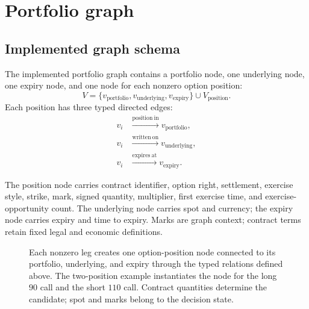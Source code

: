 \documentclass{strategynet-journal}
\begin{document}
\section{Portfolio graph}
\label{sec:graph}

\subsection{Implemented graph schema}

The implemented portfolio graph contains a portfolio node, one underlying
node, one expiry node, and one node for each nonzero option position:
\[
  V=\{v_{\mathrm{portfolio}},v_{\mathrm{underlying}},
       v_{\mathrm{expiry}}\}\cup V_{\mathrm{position}}.
\]
Each position has three typed directed edges:
\[
\begin{aligned}
  v_i&\xrightarrow{\mathrm{position\ in}}v_{\mathrm{portfolio}},\\
  v_i&\xrightarrow{\mathrm{written\ on}}v_{\mathrm{underlying}},\\
  v_i&\xrightarrow{\mathrm{expires\ at}}v_{\mathrm{expiry}}.
\end{aligned}
\]

The position node carries contract identifier, option right, settlement,
exercise style, strike, mark, signed quantity, multiplier, first exercise
time, and exercise-opportunity count.  The underlying node carries spot and
currency; the expiry node carries expiry and time to expiry.  Marks are graph
context; contract terms retain fixed legal and economic definitions.

\begin{figure}[H]
  \centering
  \caption{Each nonzero leg creates one option-position node connected to its
  portfolio, underlying, and expiry through the typed relations defined
  above.  The two-position example instantiates the node for the long \(90\)
  call and the short \(110\) call.  Contract quantities determine the
  candidate; spot and marks belong to the decision state.}
  \label{fig:portfolio-graph}
\end{figure}
\end{document}
